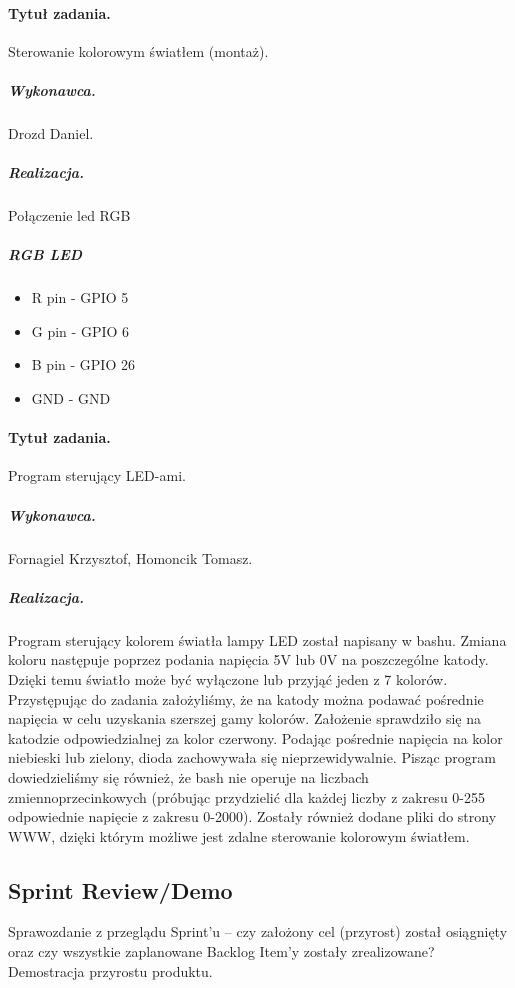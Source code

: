 \paragraph{Tytuł zadania.} Sterowanie kolorowym światłem (montaż).
\subparagraph{Wykonawca.} Drozd Daniel.
\subparagraph{Realizacja.} Połączenie led RGB
\subparagraph{RGB LED}

\begin{itemize}
	\item R pin - GPIO 5
	\item G pin - GPIO 6
	\item B pin - GPIO 26
	\item GND - GND
\end{itemize}

\paragraph{Tytuł zadania.} Program sterujący LED-ami.
\subparagraph{Wykonawca.} Fornagiel Krzysztof, Homoncik Tomasz.
\subparagraph{Realizacja.} Program sterujący kolorem światła lampy LED został napisany w bashu. Zmiana koloru następuje poprzez podania napięcia 5V lub 0V na poszczególne katody. Dzięki temu światło może być wyłączone lub przyjąć jeden z 7 kolorów. Przystępując do zadania założyliśmy, że na katody można podawać pośrednie napięcia w celu uzyskania szerszej gamy kolorów. Założenie sprawdziło się na katodzie odpowiedzialnej za kolor czerwony. Podając pośrednie napięcia na kolor niebieski lub zielony, dioda zachowywała się nieprzewidywalnie. Pisząc program dowiedzieliśmy się również, że bash nie operuje na liczbach zmiennoprzecinkowych (próbując przydzielić dla każdej liczby z zakresu 0-255 odpowiednie napięcie z zakresu 0-2000). Zostały również dodane pliki do strony WWW, dzięki którym możliwe jest zdalne sterowanie kolorowym światłem.


\subsection{Sprint Review/Demo}
Sprawozdanie z przeglądu Sprint'u -- czy założony cel (przyrost) został osiągnięty oraz czy wszystkie zaplanowane Backlog Item'y zostały zrealizowane? Demostracja przyrostu produktu.
